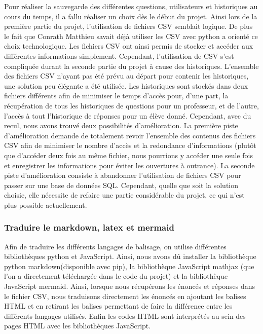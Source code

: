\documentclass[a4paper, 12pt]{article}
\begin{document}
 
Pour réaliser la sauvegarde des différentes questions, utilisateurs et historiques au cours du temps, il a fallu réaliser un choix dès le début du projet. 
 Ainsi lors de la première partie du projet, l'utilisation de fichiers CSV semblait logique.
 De plus le fait que Conrath Matthieu savait déjà utiliser les CSV avec python a orienté ce choix technologique. 
 Les fichiers CSV ont ainsi permis de stocker et accéder aux différentes informations simplement.
 Cependant, l'utilisation de CSV s'est compliquée durant la seconde partie du projet à cause des historiques.
 L'ensemble des fichiers CSV n'ayant pas été prévu au départ pour contenir les historiques, une solution peu élégante a été utilisée. 
Les historiques sont stockés dans deux fichiers différents afin de minimiser le temps d'accès pour, d'une part, la récupération de tous les historiques de questions pour un professeur, et de l'autre, l'accès à tout l'historique de réponses pour un élève donné. 
 Cependant, avec du recul, nous avons trouvé deux possibilités d'amélioration.
 La première piste d'amélioration demande de totalement revoir l'ensemble des contenus des fichiers CSV afin de minimiser le nombre d'accès et la redondance d'informations (plutôt que d'accéder deux fois au même fichier, nous pourrions y accéder une seule fois et enregistrer les informations pour éviter les ouvertures à outrance). 
 La seconde piste d'amélioration consiste à abandonner l'utilisation de fichiers CSV pour passer sur une base de données SQL. Cependant, quelle que soit la solution choisie, elle nécessite de refaire une partie considérable du projet, ce qui n'est plus possible actuellement.
 
 \subsubsection{Traduire le markdown, latex et mermaid}
Afin de traduire les différents langages de balisage, on utilise différentes bibliothèques python et JavaScript. Ainsi, nous avons dû installer la bibliothèque python markdown(disponible avec pip), la bibliothèque JavaScript mathjax (que l'on a directement téléchargée dans le code du projet) et la bibliothèque JavaScript mermaid. Ainsi, lorsque nous récupérons les énoncés et réponses dans le fichier CSV, nous traduisons directement les énoncés en ajoutant les balises HTML et en retirant les balises permettant de faire la différence entre les différents langages utilisés. Enfin les codes HTML sont interprétés au sein des pages HTML avec les bibliothèques JavaScript.
\end{document}
